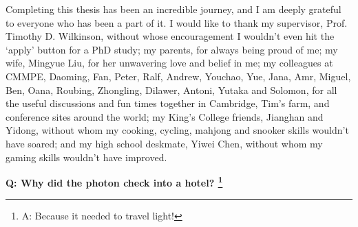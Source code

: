
\begin{acknowledgements}

Completing this thesis has been an incredible journey, and I am deeply grateful to everyone who has been a part of it. I would like to thank my supervisor, Prof. Timothy D. Wilkinson, without whose encouragement I wouldn't even hit the `apply' button for a PhD study; my parents, for always being proud of me; my wife, Mingyue Liu, for her unwavering love and belief in me; my colleagues at CMMPE, Daoming, Fan, Peter, Ralf, Andrew, Youchao, Yue, Jana, Amr, Miguel, Ben, Oana, Roubing, Zhongling, Dilawer, Antoni, Yutaka and Solomon, for all the useful discussions and fun times together in Cambridge, Tim's farm, and conference sites around the world; my King's College friends, Jianghan and Yidong, without whom my cooking, cycling, mahjong and snooker skills wouldn't have soared; and my high school deskmate, Yiwei Chen, without whom my gaming skills wouldn't have improved.

\begin{center}
    \textbf{Q: Why did the photon check into a hotel? \footnote{A: Because it needed to travel light!}}
\end{center}


\end{acknowledgements}
